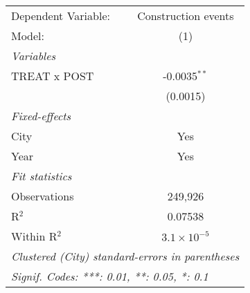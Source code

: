 \begingroup
\centering
\begin{tabular}{lc}
   \tabularnewline \midrule \midrule
   Dependent Variable: & Construction events\\  
   Model:              & (1)\\  
   \midrule
   \emph{Variables}\\
   TREAT x POST        & -0.0035$^{**}$\\   
                       & (0.0015)\\   
   \midrule
   \emph{Fixed-effects}\\
   City                & Yes\\  
   Year                & Yes\\  
   \midrule
   \emph{Fit statistics}\\
   Observations        & 249,926\\  
   R$^2$               & 0.07538\\  
   Within R$^2$        & $3.1\times 10^{-5}$\\   
   \midrule \midrule
   \multicolumn{2}{l}{\emph{Clustered (City) standard-errors in parentheses}}\\
   \multicolumn{2}{l}{\emph{Signif. Codes: ***: 0.01, **: 0.05, *: 0.1}}\\
\end{tabular}
\par\endgroup
